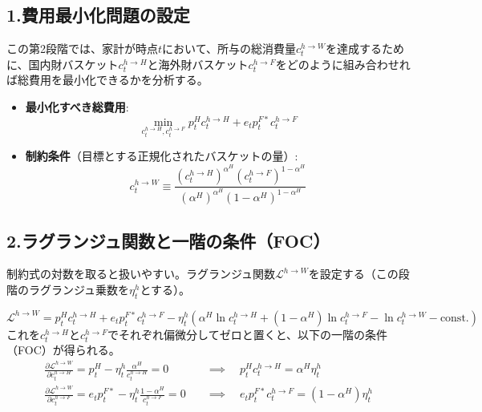 \subsection*{1.費用最小化問題の設定}
\label{sec:appendix_cpi_derivation_sub1}
この第2段階では、家計が時点\(t\)において、所与の総消費量\(c_t^{h\to W}\)を達成するために、国内財バスケット\(c_t^{h\to H}\)と海外財バスケット\(c_t^{h\to F}\)をどのように組み合わせれば総費用を最小化できるかを分析する。
\begin{itemize}
    \item\label{itm:appendix_cpi_derivation_sub1_obj}\textbf{最小化すべき総費用}:
    \begin{equation}
    \min_{c_t^{h\to H},c_t^{h\to F}}p_t^Hc_t^{h\to H}+e_tp_t^{F*}c_t^{h\to F}
    \label{eq:appendix_cpi_derivation_sub1_objective}
    \end{equation}
    \item\label{itm:appendix_cpi_derivation_sub1_const}\textbf{制約条件}（目標とする正規化されたバスケットの量）:
    \begin{equation}
    c_t^{h\to W}\equiv\frac{(c_t^{h\to H})^{\alpha^H}(c_t^{h\to F})^{1-\alpha^H}}{(\alpha^H)^{\alpha^H}(1-\alpha^H)^{1-\alpha^H}}
    \label{eq:appendix_cpi_derivation_sub1_constraint}
    \end{equation}
\end{itemize}

\subsection*{2.ラグランジュ関数と一階の条件（FOC）}
\label{sec:appendix_cpi_derivation_sub2}
制約式の対数を取ると扱いやすい。ラグランジュ関数\(\mathcal{L}^{h\to W}\)を設定する（この段階のラグランジュ乗数を\(\eta_t^h\)とする）。



\begin{equation}
\mathcal{L}^{h\to W}=p_t^Hc_t^{h\to H}+e_tp_t^{F*}c_t^{h\to F}-\eta_t^h\left(\alpha^H\ln c_t^{h\to H}+(1-\alpha^H)\ln c_t^{h\to F}-\ln c_t^{h\to W}-\text{const.}\right)
\label{eq:appendix_cpi_derivation_sub2_lagrangian}
\end{equation}
これを\(c_t^{h\to H}\)と\(c_t^{h\to F}\)でそれぞれ偏微分してゼロと置くと、以下の一階の条件（FOC）が得られる。
\begin{align}
\frac{\partial\mathcal{L}^{h\to W}}{\partial c_t^{h\to H}}=p_t^H-\eta_t^h\frac{\alpha^H}{c_t^{h\to H}}=0\quad&\implies\quad p_t^Hc_t^{h\to H}=\alpha^H\eta_t^h \label{eq:appendix_cpi_derivation_sub2_foc_h}\\
\frac{\partial\mathcal{L}^{h\to W}}{\partial c_t^{h\to F}}=e_tp_t^{F*}-\eta_t^h\frac{1-\alpha^H}{c_t^{h\to F}}=0\quad&\implies\quad e_tp_t^{F*}c_t^{h\to F}=(1-\alpha^H)\eta_t^h \label{eq:appendix_cpi_derivation_sub2_foc_f}
\end{align}


